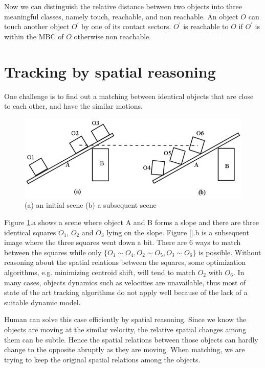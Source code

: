 \documentclass[letterpaper]{article}
\begin{document}
Now we can distinguish the relative distance between two objects into three meaningful classes, namely touch, reachable, and non reachable. An object $O$ can touch another object $O^\prime$ by one of its contact sectors. $O^\prime$ is reachable to $O$ if $O^\prime$ is within the MBC of $O$ otherwise non reachable.



\section{Tracking by spatial reasoning}\label{trackingBySpatialReasoning}

One challenge is to find out a matching between identical objects that are close to each other, and have the similar motions.  
\begin{figure}[h!]\label{SCOExample_2}
\centering\includegraphics[scale=0.3]{SCOScenario_2.png}\caption{(a) an initial scene (b) a subsequent scene}
\end{figure}
Figure \ref{SCOExample_2}.a  shows a scene where object A and B forms a slope and there are three identical squares $O_1$, $O_2$ and $O_3$ lying on the slope. Figure \ref{}.b is a subsequent image where the three squares went down a bit. There are 6 ways to match between the squares while only $\{O_1 \sim O_4, O_2 \sim O_5, O_3 \sim O_6\}$ is possible. Without reasoning about the spatial relations between the squares, some optimization algorithms, e.g. minimizing centroid shift, will tend to match $O_2$ with $O_6$. In many cases, objects dynamics such as velocities are unavailable, thus most of state of the art tracking algorithms do not apply well because of the lack of a suitable dynamic model. 

Human can solve this case efficiently by spatial reasoning. Since we know the objects are moving at the similar velocity, the relative spatial changes among them can be subtle. Hence the spatial relations between those objects can hardly change to the opposite abruptly as they are moving. When matching, we are trying to keep the original spatial relations among the objects. 
\end{document}
